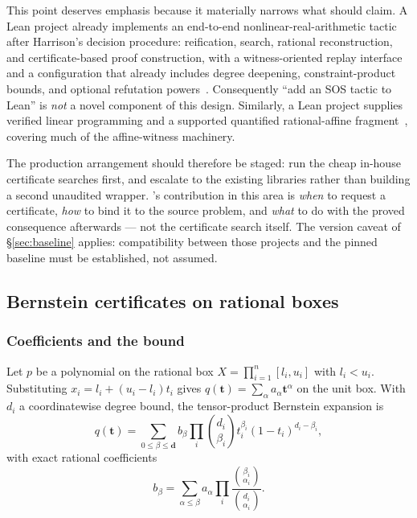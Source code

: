 \begin{remark}
\label{rem:sos-reuse}
This point deserves emphasis because it materially narrows what \forge{} should
claim. A Lean  project already implements an end-to-end
nonlinear-real-arithmetic tactic after Harrison's decision procedure: reification,
search, rational reconstruction, and certificate-based proof construction, with
a witness-oriented replay interface and a configuration that already includes
degree deepening, constraint-product bounds, and optional refutation
powers~\cite{lean-sos,sos-engine,sos-core}. Consequently ``add an SOS tactic to
Lean'' is \emph{not} a novel component of this design. Similarly, a Lean
 project supplies verified linear programming and a supported
quantified rational-affine fragment~\cite{lean-lp,lp-blog}, covering much of the
affine-witness machinery.

The production arrangement should therefore be staged: run the cheap in-house
certificate searches first, and escalate to the existing libraries rather than
building a second unaudited wrapper. \forge{}'s contribution in this area is
\emph{when} to request a certificate, \emph{how} to bind it to the source
problem, and \emph{what} to do with the proved consequence afterwards --- not
the certificate search itself. The version caveat of \S\ref{sec:baseline}
applies: compatibility between those projects and the pinned baseline must be
established, not assumed.
\end{remark}

\subsection{Bernstein certificates on rational boxes}

\subsubsection*{Coefficients and the bound}

Let $p$ be a polynomial on the rational box
$X=\prod_{i=1}^{n}[l_i,u_i]$ with $l_i<u_i$. Substituting
$x_i=l_i+(u_i-l_i)t_i$ gives $q(\bm t)=\sum_\alpha a_\alpha\bm t^\alpha$ on the
unit box. With $d_i$ a coordinatewise degree bound, the tensor-product Bernstein
expansion is
\[
 q(\bm t)=\sum_{0\le\beta\le\bm d} b_\beta
   \prod_i\binom{d_i}{\beta_i}t_i^{\beta_i}(1-t_i)^{d_i-\beta_i},
\]
with exact rational coefficients
\begin{equation}
 b_\beta=\sum_{\alpha\le\beta}a_\alpha
     \prod_i\frac{\binom{\beta_i}{\alpha_i}}{\binom{d_i}{\alpha_i}} .
 \label{eq:bernstein}
\end{equation}

